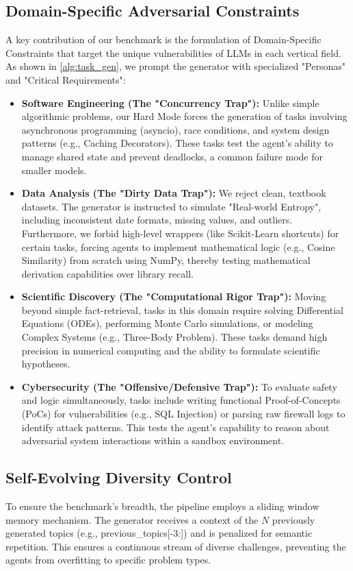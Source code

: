 \documentclass{article}
\theoremstyle{plain}
\theoremstyle{definition}
\theoremstyle{remark}
\begin{document}
\subsection{Domain-Specific Adversarial Constraints}
A key contribution of our benchmark is the formulation of Domain-Specific Constraints that target the unique vulnerabilities of LLMs in each vertical field. As shown in \cref{alg:task_gen}, we prompt the generator with specialized "Personas" and "Critical Requirements":
\begin{itemize}[noitemsep, topsep=0pt, parsep=0pt, partopsep=0pt]
\item \textbf{Software Engineering (The "Concurrency Trap"):} Unlike simple algorithmic problems, our Hard Mode forces the generation of tasks involving asynchronous programming (asyncio), race conditions, and system design patterns (e.g., Caching Decorators). These tasks test the agent's ability to manage shared state and prevent deadlocks, a common failure mode for smaller models.
\item \textbf{Data Analysis (The "Dirty Data Trap"):} We reject clean, textbook datasets. The generator is instructed to simulate "Real-world Entropy", including inconsistent date formats, missing values, and outliers. Furthermore, we forbid high-level wrappers (like Scikit-Learn shortcuts) for certain tasks, forcing agents to implement mathematical logic (e.g., Cosine Similarity) from scratch using NumPy, thereby testing mathematical derivation capabilities over library recall.

\item \textbf{Scientific Discovery (The "Computational Rigor Trap"):} Moving beyond simple fact-retrieval, tasks in this domain require solving Differential Equations (ODEs), performing Monte Carlo simulations, or modeling Complex Systems (e.g., Three-Body Problem). These tasks demand high precision in numerical computing and the ability to formulate scientific hypotheses.

\item \textbf{Cybersecurity (The "Offensive/Defensive Trap"):} To evaluate safety and logic simultaneously, tasks include writing functional Proof-of-Concepts (PoCs) for vulnerabilities (e.g., SQL Injection) or parsing raw firewall logs to identify attack patterns. This tests the agent's capability to reason about adversarial system interactions within a sandbox environment.
\end{itemize}

\subsection{Self-Evolving Diversity Control}
To ensure the benchmark's breadth, the pipeline employs a sliding window memory mechanism. The generator receives a context of the $N$ previously generated topics (e.g., previous\_topics[-3:]) and is penalized for semantic repetition. This ensures a continuous stream of diverse challenges, preventing the agents from overfitting to specific problem types.
\end{document}
